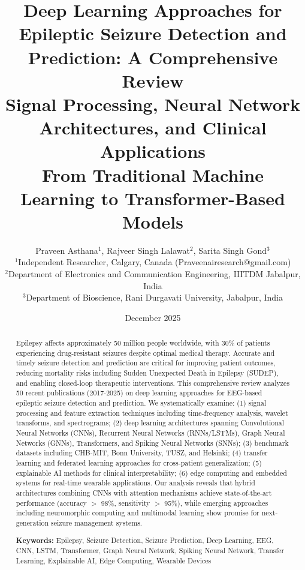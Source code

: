\documentclass[12pt,a4paper]{article}
\title{
\vspace{-1cm}
{\Huge\bfseries Deep Learning Approaches for Epileptic Seizure Detection and Prediction: A Comprehensive Review}\\[0.5cm]
{\Large Signal Processing, Neural Network Architectures, and Clinical Applications}\\[0.3cm]
{\large From Traditional Machine Learning to Transformer-Based Models}
}
\author{
Praveen Asthana$^{1}$, Rajveer Singh Lalawat$^{2}$, Sarita Singh Gond$^{3}$\\[0.3cm]
\small $^{1}$Independent Researcher, Calgary, Canada (Praveenairesearch@gmail.com)\\
\small $^{2}$Department of Electronics and Communication Engineering, IIITDM Jabalpur, India\\
\small $^{3}$Department of Bioscience, Rani Durgavati University, Jabalpur, India
}
\date{December 2025}
\begin{document}
\maketitle
\thispagestyle{empty}

\begin{abstract}
\noindent
Epilepsy affects approximately 50 million people worldwide, with 30\% of patients experiencing drug-resistant seizures despite optimal medical therapy. Accurate and timely seizure detection and prediction are critical for improving patient outcomes, reducing mortality risks including Sudden Unexpected Death in Epilepsy (SUDEP), and enabling closed-loop therapeutic interventions. This comprehensive review analyzes 50 recent publications (2017-2025) on deep learning approaches for EEG-based epileptic seizure detection and prediction. We systematically examine: (1) signal processing and feature extraction techniques including time-frequency analysis, wavelet transforms, and spectrograms; (2) deep learning architectures spanning Convolutional Neural Networks (CNNs), Recurrent Neural Networks (RNNs/LSTMs), Graph Neural Networks (GNNs), Transformers, and Spiking Neural Networks (SNNs); (3) benchmark datasets including CHB-MIT, Bonn University, TUSZ, and Helsinki; (4) transfer learning and federated learning approaches for cross-patient generalization; (5) explainable AI methods for clinical interpretability; (6) edge computing and embedded systems for real-time wearable applications. Our analysis reveals that hybrid architectures combining CNNs with attention mechanisms achieve state-of-the-art performance (accuracy $>$ 98\%, sensitivity $>$ 95\%), while emerging approaches including neuromorphic computing and multimodal learning show promise for next-generation seizure management systems.

\vspace{0.3cm}
\noindent\textbf{Keywords:} Epilepsy, Seizure Detection, Seizure Prediction, Deep Learning, EEG, CNN, LSTM, Transformer, Graph Neural Network, Spiking Neural Network, Transfer Learning, Explainable AI, Edge Computing, Wearable Devices
\end{abstract}

\newpage
\tableofcontents
\newpage

\end{document}
